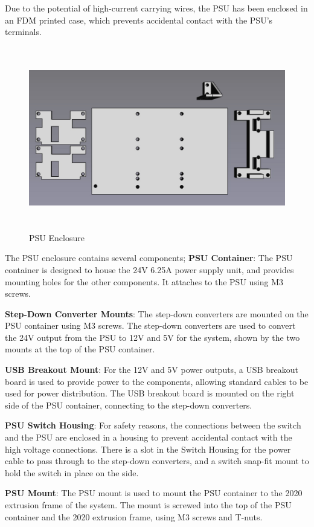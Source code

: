 Due to the potential of high-current carrying wires, the PSU has been enclosed in an FDM printed case, which prevents accidental contact with the PSU's terminals.

\begin{figure}[H]
    \hfill
    \begin{minipage}[h]{0.95\textwidth}
        \centering
        \includegraphics[height=8cm]{imgs/freecad/psu_mount.jpg}
        \caption{PSU Enclosure}
    \end{minipage}
    \hfill
\end{figure}

The PSU enclosure contains several components;
\textbf{PSU Container}: The PSU container is designed to house the 24V 6.25A power supply unit, and provides mounting holes for the other components. It attaches to the PSU using M3 screws.
\par
\textbf{Step-Down Converter Mounts}: The step-down converters are mounted on the PSU container using M3 screws. The step-down converters are used to convert the 24V output from the PSU to 12V and 5V for the system, shown by the two mounts at the top of the PSU container.
\par
\textbf{USB Breakout Mount}: For the 12V and 5V power outputs, a USB breakout board is used to provide power to the components, allowing standard cables to be used for power distribution. The USB breakout board is mounted on the right side of the PSU container, connecting to the step-down converters.
\par
\textbf{PSU Switch Housing}: For safety reasons, the connections between the switch and the PSU are enclosed in a housing to prevent accidental contact with the high voltage connections. There is a slot in the Switch Housing for the power cable to pass through to the step-down converters, and a switch snap-fit mount to hold the switch in place on the side.
\par
\textbf{PSU Mount}: The PSU mount is used to mount the PSU container to the 2020 extrusion frame of the system. The mount is screwed into the top of the PSU container and the 2020 extrusion frame, using M3 screws and T-nuts.

